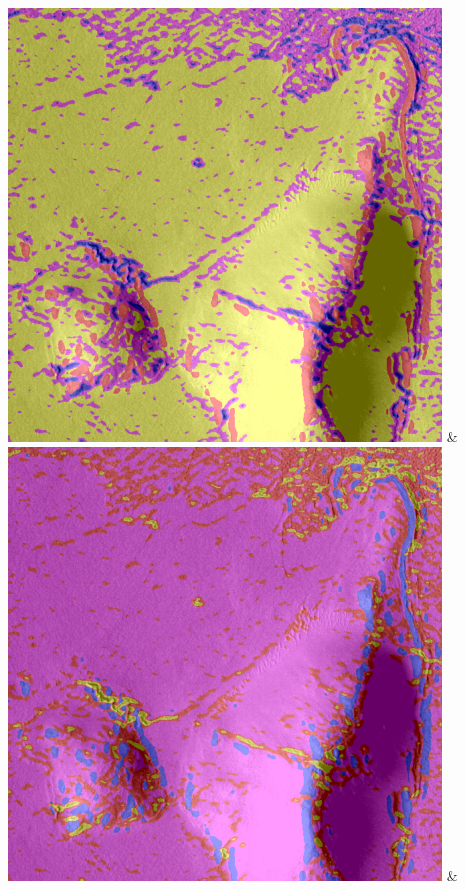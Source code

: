 \begin{table}[h!]
\begin{tabularx}{\textwidth}
		\includegraphics[width=0.9\linewidth]{images/gen/spatial_weight/p03_04.png_0.00.png} &
		\includegraphics[width=0.9\linewidth]{images/gen/spatial_weight/p03_04.png_0.33.png} &

\end{tabularx}
\end{table}
